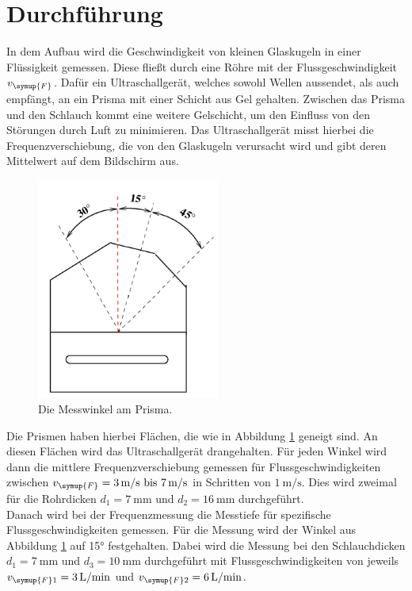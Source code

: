 \section{Durchführung}

    	In dem Aufbau wird die Geschwindigkeit von kleinen Glaskugeln in einer Flüssigkeit gemessen.
        Diese fließt durch eine Röhre mit der Flussgeschwindigkeit $v_{\symup{F}}$. Dafür ein
        Ultraschallgerät, welches sowohl Wellen aussendet, als auch empfängt, an ein Prisma mit
        einer Schicht aus Gel gehalten. Zwischen das Prisma und den Schlauch kommt eine weitere
        Gelschicht, um den Einfluss von den Störungen durch Luft zu minimieren. 
        Das Ultraschallgerät misst hierbei die Frequenzverschiebung, die von den Glaskugeln
        verursacht wird und gibt deren Mittelwert auf dem Bildschirm aus. \\

        \begin{figure}[H]
            \centering
            \includegraphics[width=6cm]{Bilder/winkel.png}
            \caption{Die Messwinkel am Prisma.}
            \label{fig:winkel}       
        \end{figure}
        \noindent Die Prismen haben hierbei Flächen, die wie in Abbildung \ref{fig:winkel} geneigt sind.
        An diesen Flächen wird das Ultraschallgerät drangehalten. Für jeden Winkel wird dann die mittlere
        Frequenzverschiebung gemessen für Flussgeschwindigkeiten zwischen $v_{\symup{F}}=\qty{3}{\meter\per\second}\text{ bis }
        \qty{7}{\meter\per\second}$ in Schritten von $\qty{1}{\meter\per\second}$. Dies wird zweimal für die
        Rohrdicken $d_1=\qty{7}{\milli\meter}$ und $d_2=\qty{16}{\milli\meter}$ durchgeführt.\\
        \noindent Danach wird bei der Frequenzmessung die Messtiefe für spezifische Flussgeschwindigkeiten gemessen.
        Für die Messung wird der Winkel aus Abbildung \ref{fig:winkel} auf 15° festgehalten. Dabei wird die Messung
        bei den Schlauchdicken $d_1=\qty{7}{\milli\meter}$ und $d_3=\qty{10}{\milli\meter}$ durchgeführt mit 
        Flussgeschwindigkeiten von jeweils $v_{\symup{F}1}=\qty{3}{\liter\per\minute}$ und $v_{\symup{F}2}=\qty{6}{\liter\per\minute}$.

\label{sec:Durchführung}
